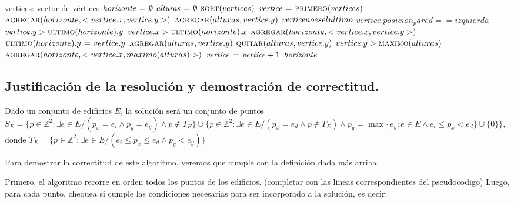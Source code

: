 \begin{codebox}
\li \Comment vertices: vector de vértices
\li $\id{horizonte} \gets \emptyset$
\li $\id{alturas} \gets \emptyset$
\li $\textnormal{\scshape sort}(vertices)$
\li $\id{vertice} \gets \proc{primero}(vertices)$
\li $\textnormal{\scshape agregar}(horizonte, <vertice.x, vertice.y>)$
\li $\textnormal{\scshape agregar}(alturas, vertice.y)$
\li \While $\id{vertice} no es el ultimo$
      \Do
\li     \If $vertice.posicion_pared == izquierda$
          \Then
\li         \If $vertice.y > \textnormal{\scshape ultimo}(horizonte).y$
              \Then
\li             \If $vertice.x > \textnormal{\scshape ultimo}(horizonte).x$
                  \Then
\li                 $\textnormal{\scshape agregar}(horizonte, <vertice.x, vertice.y>)$
\li               \Else
\li                 $\textnormal{\scshape ultimo}(horizonte).y \mathrel{\hspace{1pt}=\hspace{1pt}} vertice.y$
                 \End
              \End
\li         $\textnormal{\scshape agregar}(alturas, vertice.y)$
\li       \Else
\li         $\textnormal{\scshape quitar}(alturas, vertice.y)$
\li         \If $vertice.y > \textnormal{\scshape maximo}(alturas)$
              \Then
\li             $\textnormal{\scshape agregar}(horizonte, <vertice.x, maximo(alturas)>)$
              \End
          \End
\li     $\id{vertice} \gets \id{vertice} + 1$
      \End
\li \Return $\id{horizonte}$
\end{codebox}



\subsection{Justificación de la resolución y demostración de correctitud.}

\vspace*{0.3cm}


Dado un conjunto de edificios $E$, la solución será un conjunto de puntos
$S_E = \{p \in \mathbb{Z}^2 : \exists e \in E / (p_x = e_i \land p_y = e_y) \land
p \notin T_E\} \cup \{p \in \mathbb{Z}^2 : \exists e \in E / (p_x = e_d \land p
\notin T_E) \land p_y = \max{\{e_y : e \in E \land e_i \leq p_x < e_d\} \cup \{0\}}\}$,
donde $T_E = \{p \in \mathbb{Z}^2 : \exists e \in E / (e_i \leq p_x \leq e_d \land p_y < e_y)\}$

Para demostrar la correctitud de este algoritmo, veremos que cumple con la 
definición dada más arriba. 

Primero, el algoritmo recorre en orden todos los puntos de los edificios. 
(completar con las lineas correspondientes del pseudocodigo)
Luego, para cada punto, chequea si cumple las condiciones necesarias para ser 
incorporado a la solución, es decir:

